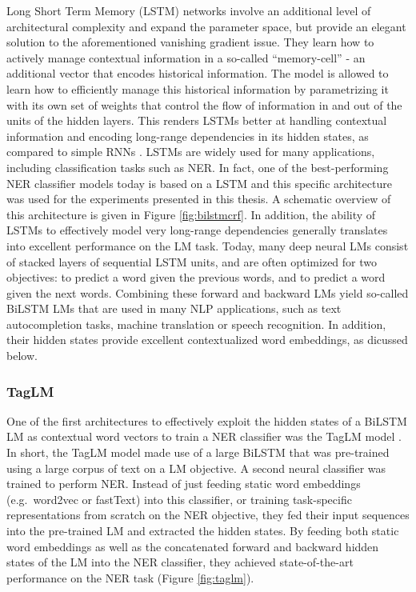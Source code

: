 \documentclass[12pt,a4paper,]{book}
\begin{document}
Long Short Term Memory (LSTM) networks involve an additional level of architectural complexity and expand the parameter space, but provide an elegant solution to the aforementioned vanishing gradient issue. They learn how to actively manage contextual information in a so-called ``memory-cell'' - an additional vector that encodes historical information. The model is allowed to learn how to efficiently manage this historical information by parametrizing it with its own set of weights that control the flow of information in and out of the units of the hidden layers. This renders LSTMs better at handling contextual information and encoding long-range dependencies in its hidden states, as compared to simple RNNs \citep{goodfellow2016}. LSTMs are widely used for many applications, including classification tasks such as NER. In fact, one of the best-performing NER classifier models today is based on a LSTM and this specific architecture was used for the experiments presented in this thesis. A schematic overview of this architecture is given in Figure \ref{fig:bilstmcrf}. In addition, the ability of LSTMs to effectively model very long-range dependencies generally translates into excellent performance on the LM task. Today, many deep neural LMs consist of stacked layers of sequential LSTM units, and are often optimized for two objectives: to predict a word given the previous words, and to predict a word given the next words. Combining these forward and backward LMs yield so-called BiLSTM LMs that are used in many NLP applications, such as text autocompletion tasks, machine translation or speech recognition. In addition, their hidden states provide excellent contextualized word embeddings, as dicussed below.

\hypertarget{taglm}{%
\subsubsection{TagLM}\label{taglm}}

One of the first architectures to effectively exploit the hidden states of a BiLSTM LM as contextual word vectors to train a NER classifier was the TagLM model \citep{peters2017}. In short, the TagLM model made use of a large BiLSTM that was pre-trained using a large corpus of text on a LM objective. A second neural classifier was trained to perform NER. Instead of just feeding static word embeddings (e.g.~word2vec or fastText) into this classifier, or training task-specific representations from scratch on the NER objective, they fed their input sequences into the pre-trained LM and extracted the hidden states. By feeding both static word embeddings as well as the concatenated forward and backward hidden states of the LM into the NER classifier, they achieved state-of-the-art performance on the NER task (Figure \ref{fig:taglm}).
\end{document}
